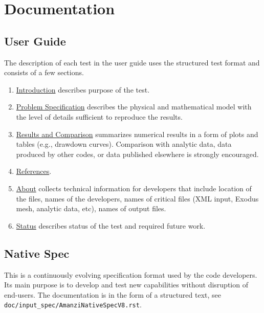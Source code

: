 %
%

\section{Documentation}

\subsection{User Guide}
The description of each test in the user guide uses the structured test format
and consists of a few sections.

\begin{enumerate}
\item \underline{Introduction} describes purpose of the test.
\item \underline{Problem Specification} describes the physical and mathematical model 
      with the level of details sufficient to reproduce the results.
\item \underline{Results and Comparison} summarizes numerical results in a form of plots
      and tables (e.g., drawdown curves). Comparison with analytic data, data produced 
      by other codes, or data published elsewhere is strongly encouraged.
\item \underline{References}.
\item \underline{About} collects technical information for developers that include 
      location of the files, names of the developers, names of critical files (XML input,
      Exodus mesh, analytic data, etc), names of output files.
\item \underline{Status} describes status of the test and required future work.
\end{enumerate}


\subsection{Native Spec}
This is a continuously evolving specification format used by the code developers. 
Its main purpose is to develop and test new capabilities without disruption of end-users.
The documentation is in the form of a structured text, see {\tt doc/input\_spec/AmanziNativeSpecV8.rst}.



